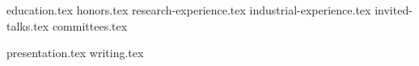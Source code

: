 \documentclass[11pt, a4paper]{awesome-cv}
\newcommand*{\sectiondir}{resume/}
\begin{document}
	
	
	
	

{education.tex}
{honors.tex}
{research-experience.tex}
{industrial-experience.tex}
{invited-talks.tex}
{committees.tex}



% 



\nocite{batra2013indic}



\nocite{*}

{presentation.tex}
{writing.tex}
\end{document}
